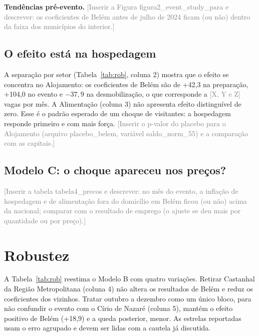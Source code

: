\documentclass[12pt,a4paper]{article}
\newcommand{\afazer}[1]{\textcolor{gray}{[#1]}}
\begin{document}
\textbf{Tendências pré-evento.} \afazer{Inserir a Figura figura2\_event\_study\_para e descrever:
os coeficientes de Belém antes de julho de 2024 ficam (ou não) dentro da faixa dos municípios do
interior.}

\subsection{O efeito está na hospedagem}

A separação por setor (Tabela~\ref{tab:rob}, coluna 2) mostra que o efeito se concentra no
Alojamento: os coeficientes de Belém são de +42,3 na preparação, +104,0 no evento e $-37{,}9$ na
desmobilização, o que corresponde a \afazer{X, Y e Z} vagas por mês. A Alimentação (coluna 3) não
apresenta efeito distinguível de zero. Esse é o padrão esperado de um choque de visitantes: a
hospedagem responde primeiro e com mais força. \afazer{Inserir o p-valor do placebo para o
Alojamento (arquivo placebo\_belem, variável saldo\_norm\_55) e a comparação com as capitais.}

\subsection{Modelo C: o choque apareceu nos preços?}

\afazer{Inserir a tabela tabela4\_precos e descrever: no mês do evento, a inflação de hospedagem e de
alimentação fora do domicílio em Belém ficou (ou não) acima da nacional; comparar com o resultado de
emprego (o ajuste se deu mais por quantidade ou por preço).}

\section{Robustez}

A Tabela~\ref{tab:rob} reestima o Modelo B com quatro variações. Retirar Castanhal da Região
Metropolitana (coluna 4) não altera os resultados de Belém e reduz os coeficientes dos vizinhos.
Tratar outubro a dezembro como um único bloco, para não confundir o evento com o Círio de Nazaré
(coluna 5), mantém o efeito positivo de Belém (+18,9) e a queda posterior, menor. As estrelas
reportadas usam o erro agrupado e devem ser lidas com a cautela já discutida.
\end{document}
